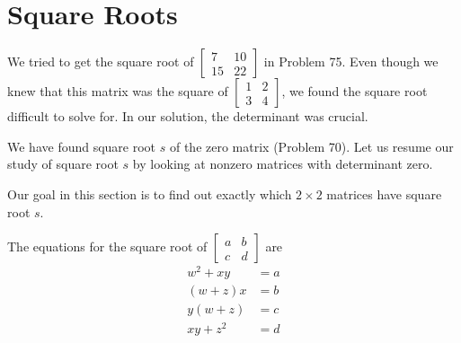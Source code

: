 \documentclass{article}
\begin{document}
\newpage

\section{Square Roots}

We tried to get the square root of $\begin{bmatrix} 7 & 10 \\ 15 & 22 \end{bmatrix}$ in Problem 75. Even though we knew that this matrix was the square of $\begin{bmatrix} 1 & 2 \\ 3 & 4 \end{bmatrix}$, we found the square root difficult to solve for. In our solution, the determinant was crucial.

We have found square root $s$ of the zero matrix (Problem 70). Let us resume our study of square root $s$ by looking at nonzero matrices with determinant zero.

Our goal in this section is to find out exactly which $2 \times 2$ matrices have square root $s$.

The equations for the square root of $\begin{bmatrix} a & b \\ c & d \end{bmatrix}$ are
\begin{align*} 
w^2 + xy & = a \\
(w+z) x  & = b \\
y (w+z)  & = c \\
xy + z^2 & = d \\
\end{align*}
\end{document}

